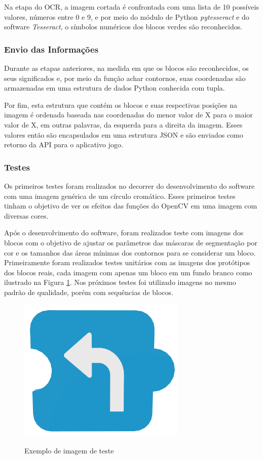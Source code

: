     Na etapa do OCR, a imagem cortada é confrontada com uma lista de 10 possíveis valores, números entre 0 e 9, e por meio do módulo de Python \textit{pytesseract} e do software \textit{Tesseract}, o símbolos numéricos dos blocos verdes são reconhecidos.


    \subsubsection{Envio das Informações}
    Durante as etapas anteriores, na medida em que os blocos são reconhecidos, os seus significados e, por meio da função achar contornos, suas coordenadas são armazenadas em uma estrutura de dados Python conhecida com tupla.
    
    Por fim, esta estrutura que contém os blocos e suas respectivas posições na imagem é ordenada baseada nas coordenadas do menor valor de X para o maior valor de X, em outras palavras, da esquerda para a direita da imagem. Esses valores então são  encapsulados em uma estrutura JSON e são enviados como retorno da API para o aplicativo jogo.

    \subsubsection{Testes}
    
    Os primeiros testes foram realizados no decorrer do desenvolvimento do software com uma imagem genérica de um círculo cromático. Esses primeiros testes tinham o objetivo de ver os efeitos das funções do OpenCV em uma imagem com diversas cores.
    
    Após o desenvolvimento do software, foram realizados teste com imagens dos blocos com o objetivo de ajustar os parâmetros das máscaras de segmentação por cor e os tamanhos das áreas mínimas dos contornos para se considerar um bloco. Primeiramente foram realizados testes unitários com as imagens dos protótipos dos blocos reais, cada imagem com apenas um bloco em um fundo branco como ilustrado na Figura \ref{figura:ex_teste}. Nos próximos testes foi utilizado imagens no mesmo padrão de qualidade, porém com sequências de blocos.
       
    \begin{figure}[H]
        \caption{Exemplo de imagem de teste}
        \centering
        \includegraphics[width=8cm]{Imagens/Cap3/Blocos/Virar.png}
        \label{figura:ex_teste}
    \end{figure}
    
